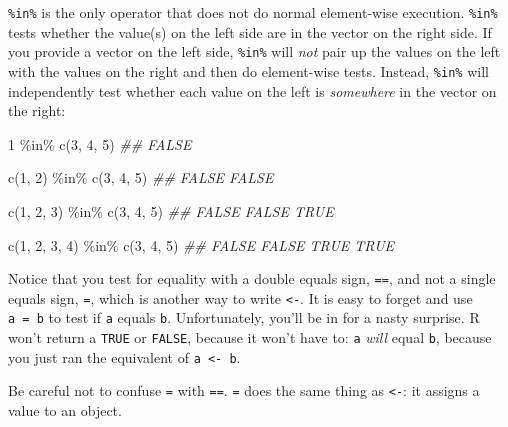 \documentclass[
  letterpaper,
  DIV=11,
  numbers=noendperiod]{scrbook}
\newenvironment{Shaded}{\begin{snugshade}}{\end{snugshade}}
\newcommand{\DecValTok}[1]{\textcolor[rgb]{0.68,0.00,0.00}{#1}}
\newcommand{\DocumentationTok}[1]{\textcolor[rgb]{0.37,0.37,0.37}{\textit{#1}}}
\newcommand{\FunctionTok}[1]{\textcolor[rgb]{0.28,0.35,0.67}{#1}}
\newcommand{\NormalTok}[1]{\textcolor[rgb]{0.00,0.23,0.31}{#1}}
\newcommand{\SpecialCharTok}[1]{\textcolor[rgb]{0.37,0.37,0.37}{#1}}
\begin{document}
\texttt{\%in\%} is the only operator that does not do normal
element-wise execution. \texttt{\%in\%} tests whether the value(s) on
the left side are in the vector on the right side. If you provide a
vector on the left side, \texttt{\%in\%} will \emph{not} pair up the
values on the left with the values on the right and then do element-wise
tests. Instead, \texttt{\%in\%} will independently test whether each
value on the left is \emph{somewhere} in the vector on the right:

\begin{Shaded}
\begin{Highlighting}[]
\DecValTok{1} \SpecialCharTok{\%in\%} \FunctionTok{c}\NormalTok{(}\DecValTok{3}\NormalTok{, }\DecValTok{4}\NormalTok{, }\DecValTok{5}\NormalTok{)}
\DocumentationTok{\#\# FALSE}

\FunctionTok{c}\NormalTok{(}\DecValTok{1}\NormalTok{, }\DecValTok{2}\NormalTok{) }\SpecialCharTok{\%in\%} \FunctionTok{c}\NormalTok{(}\DecValTok{3}\NormalTok{, }\DecValTok{4}\NormalTok{, }\DecValTok{5}\NormalTok{)}
\DocumentationTok{\#\# FALSE FALSE}

\FunctionTok{c}\NormalTok{(}\DecValTok{1}\NormalTok{, }\DecValTok{2}\NormalTok{, }\DecValTok{3}\NormalTok{) }\SpecialCharTok{\%in\%} \FunctionTok{c}\NormalTok{(}\DecValTok{3}\NormalTok{, }\DecValTok{4}\NormalTok{, }\DecValTok{5}\NormalTok{)}
\DocumentationTok{\#\# FALSE FALSE  TRUE}

\FunctionTok{c}\NormalTok{(}\DecValTok{1}\NormalTok{, }\DecValTok{2}\NormalTok{, }\DecValTok{3}\NormalTok{, }\DecValTok{4}\NormalTok{) }\SpecialCharTok{\%in\%} \FunctionTok{c}\NormalTok{(}\DecValTok{3}\NormalTok{, }\DecValTok{4}\NormalTok{, }\DecValTok{5}\NormalTok{)}
\DocumentationTok{\#\# FALSE FALSE  TRUE  TRUE}
\end{Highlighting}
\end{Shaded}

Notice that you test for equality with a double equals sign,
\texttt{==}, and not a single equals sign, \texttt{=}, which is another
way to write \texttt{\textless{}-}. It is easy to forget and use
\texttt{a\ =\ b} to test if \texttt{a} equals \texttt{b}. Unfortunately,
you'll be in for a nasty surprise. R won't return a \texttt{TRUE} or
\texttt{FALSE}, because it won't have to: \texttt{a} \emph{will} equal
\texttt{b}, because you just ran the equivalent of
\texttt{a\ \textless{}-\ b}.

\begin{tcolorbox}[enhanced jigsaw, breakable, colback=white, colbacktitle=quarto-callout-warning-color!10!white, arc=.35mm, bottomrule=.15mm, coltitle=black, left=2mm, rightrule=.15mm, colframe=quarto-callout-warning-color-frame, leftrule=.75mm, opacitybacktitle=0.6, bottomtitle=1mm, toptitle=1mm, titlerule=0mm, opacityback=0, title=\textcolor{quarto-callout-warning-color}{\faExclamationTriangle}\hspace{0.5em}{\texttt{=} is an assignment operator}, toprule=.15mm]

Be careful not to confuse \texttt{=} with \texttt{==}. \texttt{=} does
the same thing as \texttt{\textless{}-}: it assigns a value to an
object.

\end{tcolorbox}
\end{document}
